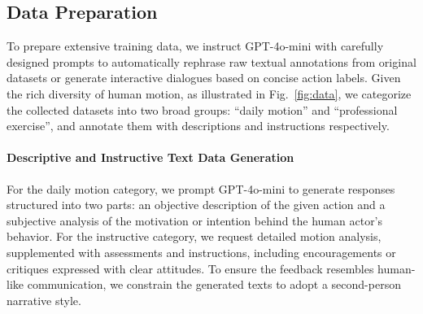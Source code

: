 \subsection{Data Preparation}
\label{sec:data_preparation}

To prepare extensive training data, we instruct GPT-4o-mini with carefully designed prompts to automatically rephrase raw textual annotations from original datasets or generate interactive dialogues based on concise action labels. Given the rich diversity of human motion, as illustrated in Fig.~\ref{fig:data}, we categorize the collected datasets into two broad groups: ``daily motion'' and ``professional exercise'', and annotate them with descriptions and instructions respectively.

\vspace{-4mm}
\paragraph{Descriptive and Instructive Text Data Generation} 

For the daily motion category, we prompt GPT-4o-mini to generate responses structured into two parts: an objective description of the given action and a subjective analysis of the motivation or intention behind the human actor's behavior. For the instructive category, we request detailed motion analysis, supplemented with assessments and instructions, including encouragements or critiques expressed with clear attitudes. To ensure the feedback resembles human-like communication, we constrain the generated texts to adopt a second-person narrative style.

